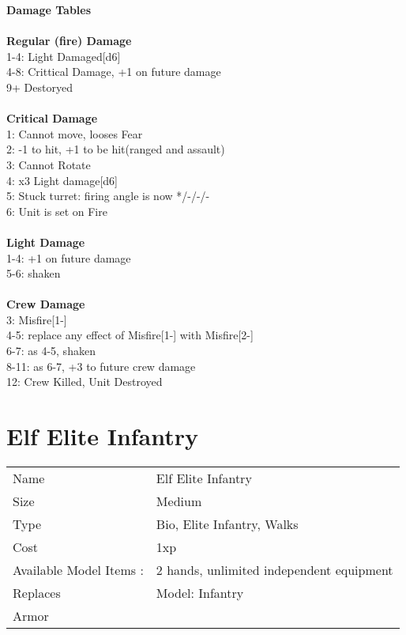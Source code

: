 {\bf Damage Tables} \\
\ \\ {\bf Regular (fire) Damage } \\
1-4: Light Damaged[d6] \\
4-8: Crittical Damage, +1 on future damage \\
9+ Destoryed \\
\ \\ {\bf Critical Damage } \\
1: Cannot move, looses Fear \\
2: -1 to hit, +1 to be hit(ranged and assault) \\
3: Cannot Rotate \\
4: x3 Light damage[d6] \\
5: Stuck turret: firing angle is now */-/-/- \\
6: Unit is set on Fire \\
\ \\ {\bf Light Damage } \\
1-4: +1 on future damage \\
5-6: shaken \\
\ \\ {\bf Crew Damage } \\
3: Misfire[1-] \\
4-5: replace any effect of Misfire[1-] with Misfire[2-] \\
6-7: as 4-5, shaken \\
8-11: as 6-7, +3 to future crew damage \\
12: Crew Killed, Unit Destroyed \\









\pagebreak

\section{ Elf Elite Infantry }

\begin{tabular}{ll}
  Name & Elf Elite Infantry \\
  Size & Medium\\
  Type & Bio, Elite Infantry, Walks\\
  Cost & 1xp\\
  Available Model Items : &2 hands, unlimited independent equipment\\
  Replaces & Model: Infantry\\
  Armor & 
\end{tabular}



